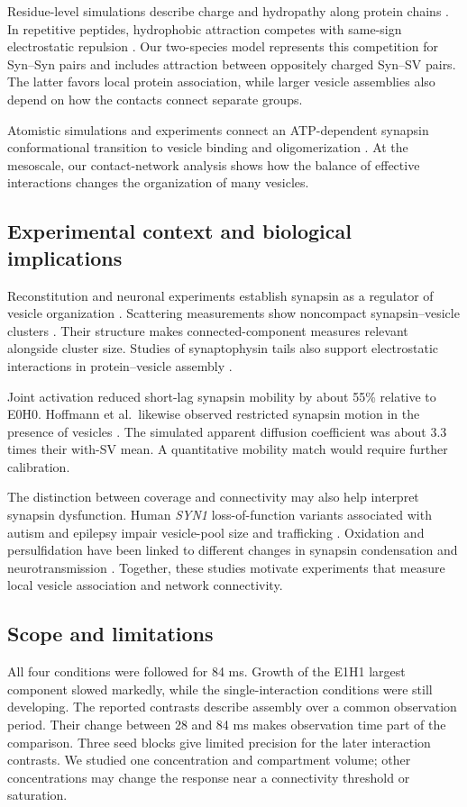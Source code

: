 \documentclass[11pt,letterpaper]{article}
\begin{document}
Residue-level simulations describe charge and hydropathy along protein
chains \cite{Dignon2018}. In repetitive peptides, hydrophobic attraction
competes with same-sign electrostatic repulsion \cite{Yang2024}. Our
two-species model represents this competition for Syn--Syn pairs and
includes attraction between oppositely charged Syn--SV pairs. The latter
favors local protein association, while larger vesicle assemblies also
depend on how the contacts connect separate groups.

Atomistic simulations and experiments connect an ATP-dependent synapsin
conformational transition to vesicle binding and oligomerization
\cite{Orlando2014}. At the mesoscale, our contact-network analysis shows
how the balance of effective interactions changes the organization of
many vesicles.

\subsection{Experimental context and biological implications}
Reconstitution and neuronal experiments establish synapsin as a regulator
of vesicle organization \cite{Milovanovic2018,Pechstein2020}. Scattering
measurements show noncompact synapsin--vesicle clusters \cite{Neuhaus2024}.
Their structure makes connected-component measures relevant alongside
cluster size. Studies of synaptophysin tails also support electrostatic
interactions in protein--vesicle assembly \cite{Park2021,Kim2021}.

Joint activation reduced short-lag synapsin mobility by about 55\%
relative to E0H0. Hoffmann et al.\ likewise observed restricted synapsin
motion in the presence of vesicles \cite{Hoffmann2023}. The simulated
apparent diffusion coefficient was about 3.3 times their with-SV mean.
A quantitative mobility match would require further calibration.

The distinction between coverage and connectivity may also help interpret
synapsin dysfunction. Human
\textit{SYN1} loss-of-function variants associated with autism and epilepsy
impair vesicle-pool size and trafficking \cite{Fassio2011}. Oxidation and
persulfidation have been linked to different changes in synapsin
condensation and neurotransmission \cite{Vignane2026}. Together, these
studies motivate experiments that measure local vesicle association and
network connectivity.

\subsection{Scope and limitations}
All four conditions were followed for 84 ms. Growth of the E1H1
largest component slowed markedly, while the single-interaction
conditions were still developing. The reported contrasts describe
assembly over a common observation period. Their change between 28
and 84 ms makes observation time part of the comparison. Three seed
blocks give limited precision for the later interaction contrasts.
We studied one concentration and compartment volume; other
concentrations may change the response near a connectivity threshold
or saturation.
\end{document}

